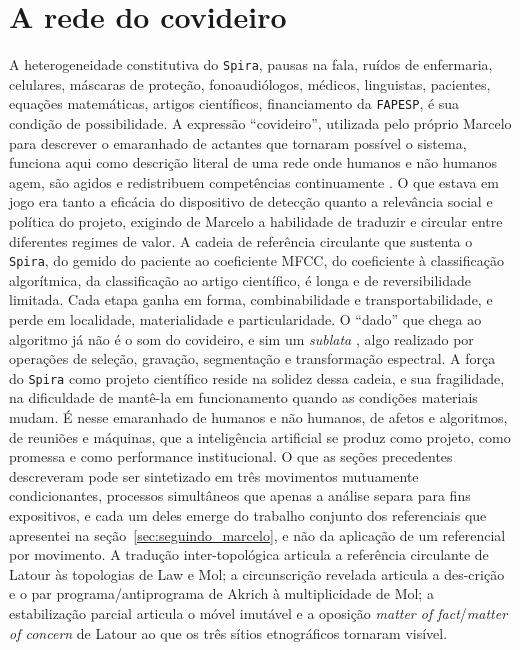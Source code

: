 \section{A rede do covideiro}
\label{sec:conclusao_cap4}

A heterogeneidade constitutiva do \texttt{Spira}, pausas na fala, ruídos de enfermaria, celulares, máscaras de proteção, fonoaudiólogos, médicos, linguistas, pacientes, equações matemáticas, artigos científicos, financiamento da \texttt{FAPESP}, é sua condição de possibilidade. A expressão \enquote{covideiro}, utilizada pelo próprio Marcelo para descrever o emaranhado de actantes que tornaram possível o sistema, funciona aqui como descrição literal de uma rede onde humanos e não humanos agem, são agidos e redistribuem competências continuamente \parencite{Latour2011CienciaEmAcao}. O que estava em jogo era tanto a eficácia do dispositivo de detecção quanto a relevância social e política do projeto, exigindo de Marcelo a habilidade de traduzir e circular entre diferentes regimes de valor. A cadeia de referência circulante \parencite{Latour2017Esperanca} que sustenta o \texttt{Spira}, do gemido do paciente ao coeficiente MFCC, do coeficiente à classificação algorítmica, da classificação ao artigo científico, é longa e de reversibilidade limitada. Cada etapa ganha em forma, combinabilidade e transportabilidade, e perde em localidade, materialidade e particularidade. O \enquote{dado} que chega ao algoritmo já não é o som do covideiro, e sim um \textit{sublata} \parencite[p.~42]{Latour2017Esperanca}, algo realizado por operações de seleção, gravação, segmentação e transformação espectral. A força do \texttt{Spira} como projeto científico reside na solidez dessa cadeia, e sua fragilidade, na dificuldade de mantê-la em funcionamento quando as condições materiais mudam. É nesse emaranhado de humanos e não humanos, de afetos e algoritmos, de reuniões e máquinas, que a inteligência artificial se produz como projeto, como promessa e como performance institucional. O que as seções precedentes descreveram pode ser sintetizado em três movimentos mutuamente condicionantes, processos simultâneos que apenas a análise separa para fins expositivos, e cada um deles emerge do trabalho conjunto dos referenciais que apresentei na seção~\ref{sec:seguindo_marcelo}, e não da aplicação de um referencial por movimento. A tradução inter-topológica articula a referência circulante de Latour às topologias de Law e Mol; a circunscrição revelada articula a des-crição e o par programa/antiprograma de Akrich à multiplicidade de Mol; a estabilização parcial articula o móvel imutável e a oposição \textit{matter of fact}/\textit{matter of concern} de Latour ao que os três sítios etnográficos tornaram visível.

